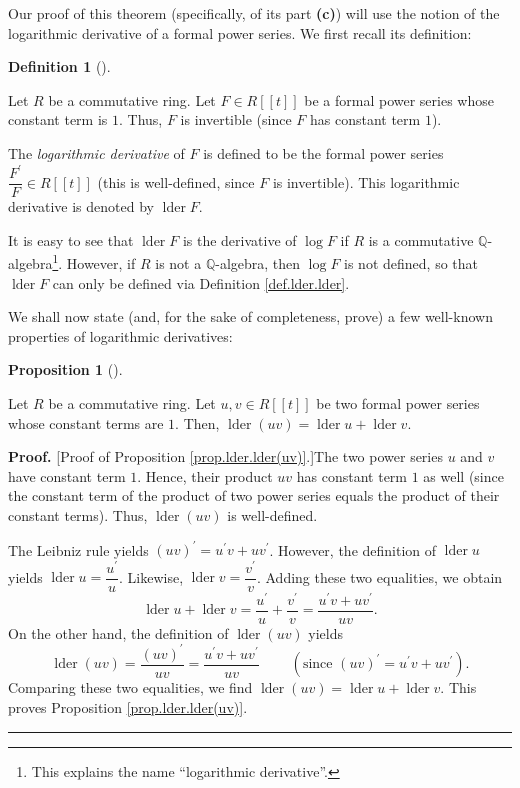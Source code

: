 \documentclass[numbers=enddot,12pt,final,onecolumn,notitlepage]{scrartcl}%
\theoremstyle{definition}
\newtheorem{prop}[theo]{Proposition}
\newenvironment{proposition}[1][]
{\begin{prop}[#1]\begin{leftbar}}
{\end{leftbar}\end{prop}}
\newtheorem{defi}[theo]{Definition}
\newenvironment{definition}[1][]
{\begin{defi}[#1]\begin{leftbar}}
{\end{leftbar}\end{defi}}
\newenvironment{proof}[1][Proof]{\noindent\textbf{#1.} }{\ \rule{0.5em}{0.5em}}
\newenvironment{verlong}{}{}
\begin{document}
\begin{verlong}
Our proof of this theorem (specifically, of its part \textbf{(c)}) will use
the notion of the logarithmic derivative of a formal power series. We first
recall its definition:

\begin{definition}
\label{def.lder.lder}Let $R$ be a commutative ring. Let $F\in R\left[  \left[
t\right]  \right]  $ be a formal power series whose constant term is $1$.
Thus, $F$ is invertible (since $F$ has constant term $1$).

The \emph{logarithmic derivative} of $F$ is defined to be the formal power
series $\dfrac{F^{\prime}}{F}\in R\left[  \left[  t\right]  \right]  $ (this
is well-defined, since $F$ is invertible). This logarithmic derivative is
denoted by $\operatorname*{lder}F$.
\end{definition}

It is easy to see that $\operatorname*{lder}F$ is the derivative of $\log F$
if $R$ is a commutative $\mathbb{Q}$-algebra\footnote{This explains the name
\textquotedblleft logarithmic derivative\textquotedblright.}. However, if $R$
is not a $\mathbb{Q}$-algebra, then $\log F$ is not defined, so that
$\operatorname*{lder}F$ can only be defined via Definition \ref{def.lder.lder}.

We shall now state (and, for the sake of completeness, prove) a few well-known
properties of logarithmic derivatives:

\begin{proposition}
\label{prop.lder.lder(uv)}Let $R$ be a commutative ring. Let $u,v\in R\left[
\left[  t\right]  \right]  $ be two formal power series whose constant terms
are $1$. Then, $\operatorname*{lder}\left(  uv\right)  =\operatorname*{lder}%
u+\operatorname*{lder}v$.
\end{proposition}

\begin{proof}
[Proof of Proposition \ref{prop.lder.lder(uv)}.]The two power series $u$ and
$v$ have constant term $1$. Hence, their product $uv$ has constant term $1$ as
well (since the constant term of the product of two power series equals the
product of their constant terms). Thus, $\operatorname*{lder}\left(
uv\right)  $ is well-defined.

The Leibniz rule yields $\left(  uv\right)  ^{\prime}=u^{\prime}v+uv^{\prime}%
$. However, the definition of $\operatorname*{lder}u$ yields
$\operatorname*{lder}u=\dfrac{u^{\prime}}{u}$. Likewise, $\operatorname*{lder}%
v=\dfrac{v^{\prime}}{v}$. Adding these two equalities, we obtain%
\[
\operatorname*{lder}u+\operatorname*{lder}v=\dfrac{u^{\prime}}{u}%
+\dfrac{v^{\prime}}{v}=\dfrac{u^{\prime}v+uv^{\prime}}{uv}.
\]
On the other hand, the definition of $\operatorname*{lder}\left(  uv\right)  $
yields%
\[
\operatorname*{lder}\left(  uv\right)  =\dfrac{\left(  uv\right)  ^{\prime}%
}{uv}=\dfrac{u^{\prime}v+uv^{\prime}}{uv}\ \ \ \ \ \ \ \ \ \ \left(
\text{since }\left(  uv\right)  ^{\prime}=u^{\prime}v+uv^{\prime}\right)  .
\]
Comparing these two equalities, we find $\operatorname*{lder}\left(
uv\right)  =\operatorname*{lder}u+\operatorname*{lder}v$. This proves
Proposition \ref{prop.lder.lder(uv)}.
\end{proof}


\end{verlong}
\end{document}
